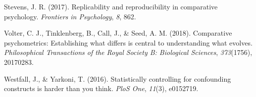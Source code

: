 \documentclass[10pt, letterpaper]{article}
\begin{document}
\leavevmode\hypertarget{ref-stevens2017replicability}{}%
Stevens, J. R. (2017). Replicability and reproducibility in comparative
psychology. \emph{Frontiers in Psychology}, \emph{8}, 862.

\leavevmode\hypertarget{ref-volter2018comparative}{}%
Volter, C. J., Tinklenberg, B., Call, J., \& Seed, A. M. (2018).
Comparative psychometrics: Establishing what differs is central to
understanding what evolves. \emph{Philosophical Transactions of the
Royal Society B: Biological Sciences}, \emph{373}(1756), 20170283.

\leavevmode\hypertarget{ref-westfall2016statistically}{}%
Westfall, J., \& Yarkoni, T. (2016). Statistically controlling for
confounding constructs is harder than you think. \emph{PloS One},
\emph{11}(3), e0152719.


\end{document}
